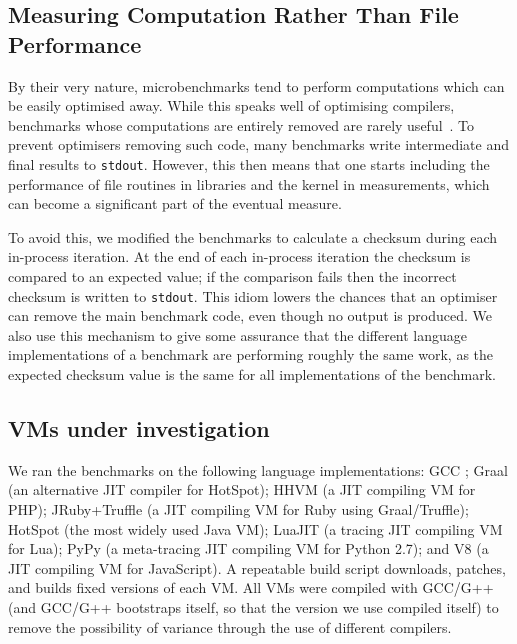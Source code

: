 \documentclass[acmsmall]{acmart}\settopmatter{printfolios=true}
\begin{document}
\subsection{Measuring Computation Rather Than File Performance}

By their very nature, microbenchmarks tend to perform computations which
can be easily optimised away. While this speaks well of
optimising compilers, benchmarks whose computations
are entirely removed are rarely useful~\cite{seaton15phd}. To prevent optimisers
removing such code, many benchmarks write intermediate and final results
to \texttt{stdout}. However, this then means that one starts including
the performance of file routines in libraries and the kernel in measurements,
which can become a significant part of the eventual measure.

To avoid this, we modified the benchmarks to calculate a checksum
during each in-process iteration. At the end of each in-process iteration
the checksum is compared to an expected value; if the comparison fails then
the incorrect checksum is written to \texttt{stdout}. This idiom
lowers the chances that an optimiser can remove the main benchmark
code, even though no output is produced. We also use this mechanism to give some assurance
that the different language implementations of a benchmark are performing
roughly the same work, as the expected checksum value is the same for all
implementations of the benchmark.


\subsection{VMs under investigation}
\label{sec:vms}

We ran the benchmarks on the following language implementations: GCC \gccversion;
Graal \graalversion (an alternative JIT compiler for HotSpot); HHVM \hhvmversion (a JIT
compiling VM for PHP); JRuby+Truffle \trufflerubyversion{} (a JIT compiling VM
for Ruby using Graal/Truffle);
HotSpot \hotspotversion (the most widely used Java
VM); LuaJIT \luajitversion (a tracing JIT compiling VM for Lua); PyPy \pypyversion (a
meta-tracing JIT compiling VM for Python 2.7); and V8 \veightversion (a JIT
compiling VM for JavaScript). A repeatable build script downloads, patches,
and builds fixed versions of each VM. All VMs were compiled with GCC/G++ \gccversion
(and GCC/G++ bootstraps itself, so that the version we use compiled itself)
to remove the possibility of variance through the use of different compilers.
\end{document}
